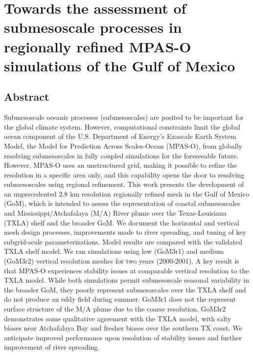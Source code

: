 


\chapter{Towards the assessment of submesoscale processes in regionally refined MPAS-O simulations of the Gulf of Mexico}

\section{Abstract}
Submesoscale oceanic processes (submesoscales) are posited to be important for the global climate system. However, computational constraints limit the global ocean component of the U.S. Department of Energy's Exascale Earth System Model, the Model for Prediction Across Scales-Ocean (MPAS-O), from globally resolving submesoscales in fully coupled simulations for the foreseeable future. However, MPAS-O uses an unstructured grid, making it possible to refine the resolution in a specific area only, and this capability opens the door to resolving submesoscales using regional refinement. This work presents the development of an unprecedented 2.8 km resolution regionally refined mesh in the Gulf of Mexico (GoM), which is intended to assess the representation of coastal submesoscales and Mississippi/Atchafalaya (M/A) River plume over the Texas-Louisiana (TXLA) shelf and the broader GoM. We document the horizontal and vertical mesh design processes, improvements made to river spreading, and tuning of key subgrid-scale parameterizations. Model results are compared with the validated TXLA shelf model. We ran simulations using low (GoM3r1) and medium (GoM3r2) vertical resolution meshes for two years (2000-2001). A key result is that MPAS-O experiences stability issues at comparable vertical resolution to the TXLA model. While both simulations permit submesoscale seasonal variability in the broader GoM, they poorly represent submesoscales over the TXLA shelf and do not produce an eddy field during summer. GoM3r1 does not the represent surface structure of the M/A plume due to the coarse resolution. GoM3r2 demonstrates some qualitative agreement with the TXLA model, with salty biases near Atchafalaya Bay and fresher biases over the southern TX coast. We anticipate improved performance upon resolution of stability issues and further improvement of river spreading.

